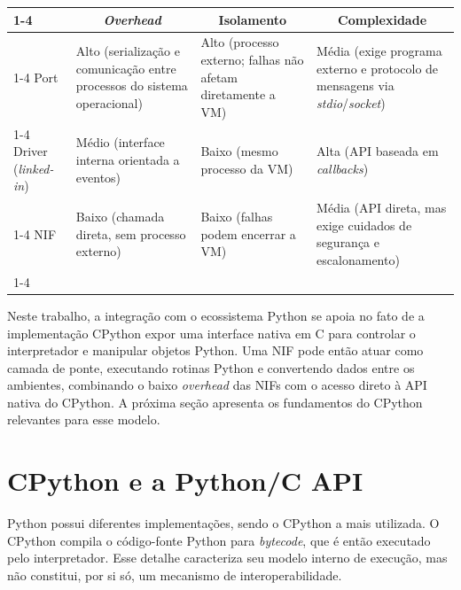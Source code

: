 \begin{tabframed}[htb]
\caption{Comparação entre Ports, Drivers e NIFs na BEAM VM}
\label{quad:nif-port-driver}
\renewcommand{\arraystretch}{1.5}
\begin{tabular}{|l|p{4cm}|p{3cm}|p{4cm}|}
\cline{1-4}
\multicolumn{1}{|c|}{\textbf{Mecanismo}} & \multicolumn{1}{c|}{\textbf{\textit{Overhead}}} & \multicolumn{1}{c|}{\textbf{Isolamento}} & \multicolumn{1}{c|}{\textbf{Complexidade}} \\ \cline{1-4}
Port & Alto (serialização e comunicação entre processos do sistema operacional) & Alto (processo externo; falhas não afetam diretamente a \gls{VM}) & Média (exige programa externo e protocolo de mensagens via \textit{stdio}/\textit{socket}) \\ \cline{1-4}
Driver (\textit{linked-in}) & Médio (interface interna orientada a eventos) & Baixo (mesmo processo da \gls{VM}) & Alta (API baseada em \textit{callbacks}) \\ \cline{1-4}
NIF & Baixo (chamada direta, sem processo externo) & Baixo (falhas podem encerrar a \gls{VM}) & Média (API direta, mas exige cuidados de segurança e escalonamento) \\ \cline{1-4}
\end{tabular}
\end{tabframed}

Neste trabalho, a integração com o ecossistema Python se apoia no fato de a implementação CPython expor uma interface nativa em C para controlar o interpretador e manipular objetos Python. Uma \gls{NIF} pode então atuar como camada de ponte, executando rotinas Python e convertendo dados entre os ambientes, combinando o baixo \textit{overhead} das \glspl{NIF} com o acesso direto à \gls{API} nativa do CPython. A próxima seção apresenta os fundamentos do CPython relevantes para esse modelo.

\section{CPython e a Python/C API}\label{sec:cpython}

Python possui diferentes implementações, sendo o CPython \citep{python2024} a mais utilizada. O CPython compila o código-fonte Python para \textit{bytecode}, que é então executado pelo interpretador. Esse detalhe caracteriza seu modelo interno de execução, mas não constitui, por si só, um mecanismo de interoperabilidade.

